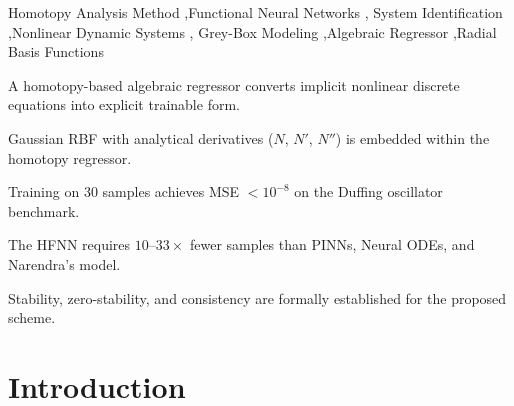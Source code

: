 \documentclass[preprint,12pt]{elsarticle}
\begin{document}
\begin{frontmatter}
\begin{abstract}
The approach is validated on four case studies of increasing complexity: (i)~a nonlinear first-order system, (ii)~a nonlinear oscillator with sine-squared dynamics, (iii)~an RBF-based approximation with parametric uncertainty, and (iv)~a Duffing oscillator with an embedded Gaussian RBF network ($M=10$ centres), where training with only 30~samples achieves MSE~$< 10^{-8}$. Comparisons with Physics-Informed Neural Networks, Neural ODEs, and Narendra's series-parallel model demonstrate the data efficiency of the approach. The HFNN delivers accurate predictions, strong extrapolation, robustness to noise and parameter variations, and interpretability, positioning it as a data-efficient and theoretically grounded tool for grey-box system identification.
\end{abstract}


\begin{keyword}
Homotopy Analysis Method \sep Functional Neural Networks \sep 
System Identification \sep Nonlinear Dynamic Systems \sep 
Grey-Box Modeling \sep Algebraic Regressor \sep Radial Basis Functions
\end{keyword}

\begin{highlights}
\item A homotopy-based algebraic regressor converts implicit nonlinear discrete equations into explicit trainable form.
\item Gaussian RBF with analytical derivatives ($N$, $N'$, $N''$) is embedded within the homotopy regressor.
\item Training on 30 samples achieves MSE $< 10^{-8}$ on the Duffing oscillator benchmark.
\item The HFNN requires $10$--$33\times$ fewer samples than PINNs, Neural ODEs, and Narendra's model.
\item Stability, zero-stability, and consistency are formally established for the proposed scheme.
\end{highlights}

\end{frontmatter}
\linenumbers

\section{Introduction}
\label{sec:introduction}
\end{document}
